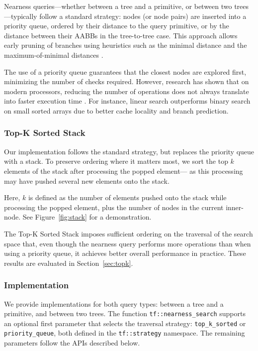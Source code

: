 Nearness queries---whether between a tree and a
primitive, or between two trees---typically follow a
standard strategy: nodes (or node pairs) are inserted
into a priority queue, ordered by their distance to the
query primitive, or by the distance between their AABBs
in the tree-to-tree case. This approach allows early
pruning of branches using heuristics such as the minimal
distance and the maximum-of-minimal distances
\cite{knn0, eknn}.

The use of a priority queue guarantees that the closest
nodes are explored first, minimizing the number of checks
required. However, research has shown that on modern
processors, reducing the number of operations does not
always translate into faster execution time
\cite{alexandrescu-sorting}. For instance, linear search
outperforms binary search on small sorted arrays due to
better cache locality and branch prediction.

\subsubsection{Top-K Sorted Stack}\label{sec:top-k}

Our implementation follows the standard strategy,
but replaces the priority queue with a stack. To preserve
ordering where it matters most, we sort the top $k$ elements
of the stack after processing the popped element—
as this processing may have pushed several new elements
onto the stack.

Here, $k$ is defined as the number of elements pushed onto the
stack while processing the popped element, plus the number
of nodes in the current inner-node. See Figure~\ref{fig:stack}
for a demonstration.


The Top-K Sorted Stack imposes sufficient ordering on the
traversal of the search space that, even though the nearness
query performs more operations than when using a
priority queue, it achieves better overall performance in
practice. These results are evaluated in
Section~\ref{sec:topk}.

\subsubsection{Implementation}

We provide implementations for both query types:
between a tree and a primitive, and between two trees.
The function \texttt{tf::nearness\_search} supports an
optional first parameter that selects the traversal
strategy: \texttt{top\_k\_sorted} or \texttt{priority\_queue},
both defined in the \texttt{tf::strategy} namespace.
The remaining parameters follow the APIs described below.


